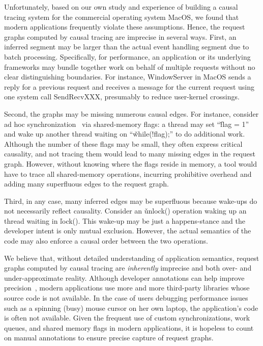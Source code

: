 Unfortunately, based on our own study and experience of building a causal
tracing system for the commercial operating system MacOS, we found that modern
applications frequently violate these assumptions. Hence, the request
graphs computed by causal tracing are imprecise in several ways.  First, an
inferred segment may be larger than the actual event handling segment due
to batch processing.  Specifically, for performance, an application or its
underlying frameworks may bundle together work on behalf of multiple requests
without no clear distinguishing boundaries.  For instance, WindowServer
in MacOS sends a reply for a previous request and receives a
message for the current request using one system call SendRecvXXX,
presumably to reduce user-kernel crossings.

Second, the graphs may be missing numerous causal edges.  For instance,
consider ad hoc synchronization~\cite{xxx} via shared-memory flags: a
thread may set ``\v{flag = 1}'' and wake up another thread waiting on
``\v{while(!flag);}'' to do additional work.  Although the number of these
flags may be small, they often express critical causality, and not tracing
them would lead to many missing edges in the request graph.  However,
without knowing where the flags reside in memory, a tool would have to
trace all shared-memory operations, incurring prohibitive overhead and
adding many superfluous edges to the request graph.

Third, in any case, many inferred edges may be superfluous because wake-ups do not
necessarily reflect causality.  Consider an \v{unlock()} operation waking
up an thread waiting in \v{lock()}.  This wake-up may be just a
happens-stance and the developer intent is only mutual exclusion.
However, the actual semantics of the code may also enforce a causal order
between the two operations.

We believe that, without detailed understanding of application semantics,
request graphs computed by causal tracing are \emph{inherently} imprecise
and both over- and under-approximate reality.  Although
developer annotations can help improve precision~\cite{}, modern
applications use more and more third-party libraries whose source code is
not available.  In the case of users debugging performance issues such as
a spinning (busy) mouse cursor on her own laptop, the application's code is often not
available.  Given the frequent use of custom synchronizations, work
queues, and shared memory flags in modern applications, it is hopeless to
count on manual annotations to ensure precise capture of request graphs.

